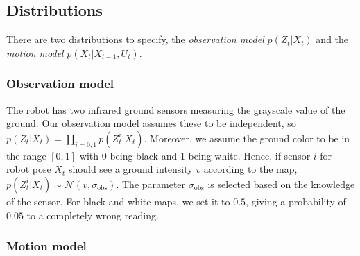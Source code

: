 \documentclass[letterpaper, 10pt, conference]{ieeeconf}
\begin{document}
\subsection{Distributions}

There are two distributions to specify, the \emph{observation model} $p(Z_t | X_t)$ and the \emph{motion model} $p(X_t|X_{t-1}, U_t)$.

\subsubsection{Observation model}

The robot has two infrared ground sensors measuring the grayscale value of the ground.
Our observation model assumes these to be independent, so $p(Z_t | X_t) = \prod_{i=0,1} p(Z_t^{i} | X_t)$.
Moreover, we assume the ground color to be in the range $[0,1]$ with $0$ being black and $1$ being white.
Hence, if sensor $i$ for robot pose $X_t$ should see a ground intensity $v$ according to the map, $p(Z_t^{i} | X_t) \sim \mathcal{N}(v,\sigma_\mathrm{obs})$.
The parameter $\sigma_\mathrm{obs}$ is selected based on the knowledge of the sensor.
For black and white maps, we set it to $0.5$, giving a probability of $0.05$ to a completely wrong reading.

\subsubsection{Motion model}
\end{document}
